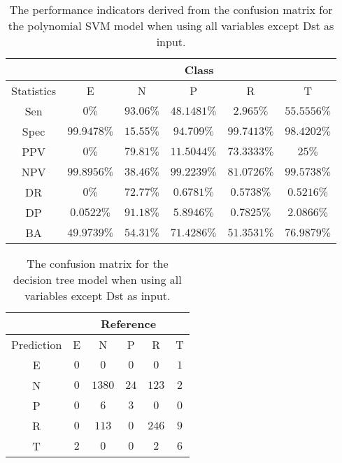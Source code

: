 \begin{table}[!ht]
	\centering
	\begin{tabular}{|c|c|c|c|c|c|}
		\hline
		 & \multicolumn{5}{c|}{Class} \\ \hline
		Statistics & E & N & P & R & T \\ \hline
		Sen & $0\%$ & $93.06\%$ & $48.1481\%$ & $2.965\%$ & $55.5556\%$ \\ \hline
		Spec & $99.9478\%$ & $15.55\%$ & $94.709\%$ & $99.7413\%$ & $98.4202\%$ \\ \hline
		PPV & $0\%$ & $79.81\%$ & $11.5044\%$ & $73.3333\%$ & $25\%$ \\ \hline
		NPV & $99.8956\%$ & $38.46\%$ & $99.2239\%$ & $81.0726\%$ & $99.5738\%$ \\ \hline
		DR & $0\%$ & $72.77\%$ & $0.6781\%$ & $0.5738\%$ & $0.5216\%$ \\ \hline
		DP & $0.0522\%$ & $91.18\%$ & $5.8946\%$ & $0.7825\%$ & $2.0866\%$ \\ \hline
		BA & $49.9739\%$ & $54.31\%$ & $71.4286\%$ & $51.3531\%$ & $76.9879\%$ \\ \hline
	\end{tabular}
	\caption{The performance indicators derived from the confusion matrix for the polynomial SVM model when using all variables except Dst as input.}
	\label{tab:cs:reverse:noDst:svmPoly}
\end{table}

\begin{table}[!ht]
	\centering
	\begin{tabular}{|c|c|c|c|c|c|}
		\hline
		 & \multicolumn{5}{|c|}{Reference} \\ \hline
		 Prediction & E & N & P & R & T \\ \hline
		 E & $0$ & $0$ & $0$ & $0$ & $1$ \\ \hline
		 N & $0$ & $1380$ & $24$ & $123$ & $2$ \\ \hline
		 P & $0$ & $6$ & $3$ & $0$ & $0$ \\ \hline
		 R & $0$ & $113$ & $0$ & $246$ & $9$ \\ \hline
		 T & $2$ & $0$ & $0$ & $2$ & $6$ \\ \hline
	\end{tabular}
	\caption{The confusion matrix for the decision tree model when using all variables except Dst as input.}
	\label{tab:cm:noDst:C5.0}
\end{table}

